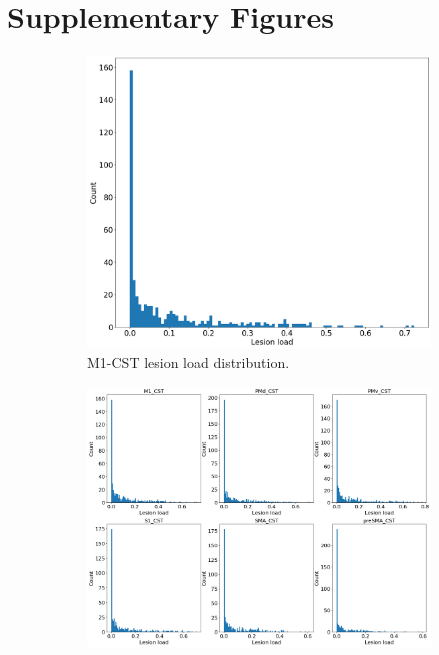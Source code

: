 \documentclass[10pt]{article}
\begin{document}
\beginsupplement
\section*{Supplementary Figures}
\begin{figure}
\begin{subfigure}{0.5\textwidth}
  \centering
  \includegraphics[width=1\linewidth]{figures/m1_lesionload.png}
  \caption{M1-CST lesion load distribution.}
  \label{fig:sfig1}
\end{subfigure}
\begin{subfigure}{0.5\textwidth}
  \centering
  \includegraphics[width=1\linewidth]{figures/all_lesionload.png}

\end{subfigure}
\end{figure}
\end{document}
